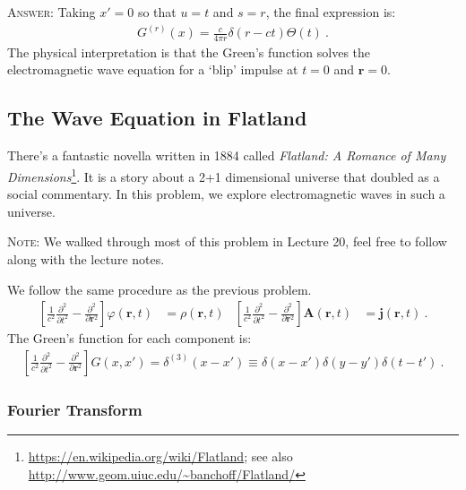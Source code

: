 \documentclass[12pt]{article}
\numberwithin{equation}{subsection}    %
\renewcommand{\vec}[1]{\mathbf{#1}} %
\begin{document}
\textsc{Answer}:
Taking $x' = 0$ so that $u=t$ and $s = r$, the final expression is:
\begin{align}
	G^{(r)}(x) = \frac{c}{4\pi r} \delta(r-ct) \Theta(t) \ .
	\label{eq:3d:G}
\end{align}
The physical interpretation is that the Green's function solves the electromagnetic wave equation for a `blip' impulse at $t=0$ and $\vec{r} = 0$. 




 





\subsection{The Wave Equation in Flatland}

There's a fantastic novella written in 1884 called \emph{Flatland: A Romance of Many Dimensions}\footnote{\url{https://en.wikipedia.org/wiki/Flatland}; see also \url{http://www.geom.uiuc.edu/~banchoff/Flatland/}}. It is a story about a 2+1 dimensional universe that doubled as a social commentary. In this problem, we explore electromagnetic waves in such a universe. 

\textsc{Note}: We walked through most of this problem in Lecture 20, feel free to follow along with the lecture notes.


We follow the same procedure as the previous problem.
\begin{align}
	\left[\frac{1}{c^2}\frac{\partial^2}{\partial t^2} - \frac{\partial^2}{\partial \vec{r}^2}\right] 
	\varphi(\vec{r},t) &= \rho(\vec{r},t)
	&
	\left[\frac{1}{c^2}\frac{\partial^2}{\partial t^2} - \frac{\partial^2}{\partial \vec{r}^2}\right]
	\vec A(\vec{r},t) &= \vec j(\vec{r},t) \ .
	\label{eq:EM:wave}
\end{align}
The Green's function for each component is:
\begin{align}
	\left[\frac{1}{c^2}\frac{\partial^2}{\partial t^2} - \frac{\partial^2}{\partial \vec{r}^2}\right] G(x,x') = \delta^{(3)}(x-x') \equiv \delta(x-x')\delta(y-y')\delta(t-t') \ .
	\label{eq:HO:in:3d}
\end{align}

\subsubsection{Fourier Transform}
\end{document}
